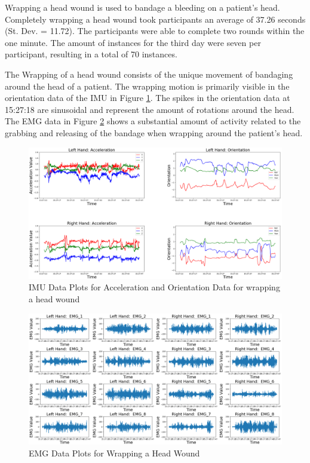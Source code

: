 Wrapping a head wound is used to bandage a bleeding on a patient's head. Completely wrapping a head wound took participants an average of 37.26 seconds (St. Dev. = 11.72). The participants were able to complete two rounds within the one minute. The amount of instances for the third day were seven per participant, resulting in a total of 70 instances.
\par The Wrapping of a head wound consists of the unique movement of bandaging around the head of a patient. The wrapping motion is primarily visible in the orientation data of the IMU in Figure \ref{fig:2334imuday3w47}. The spikes in the orientation data at 15:27:18 are sinusoidal and represent the amount of rotations around the head. The EMG data in Figure \ref{fig:2334emgday3w47} shows a substantial amount of activity related to the grabbing and releasing of the bandage when wrapping around the patient's head.
\begin{figure}[!h]
	\centering
	\includegraphics[width=0.8\linewidth]{pictures/2334_IMU_Day3_w_47}
	\caption{IMU Data Plots for Acceleration and Orientation Data for wrapping a head wound}
	\label{fig:2334imuday3w47}
\end{figure}
\begin{figure}[!h]
	\centering
	\includegraphics[width=0.8\linewidth]{pictures/2334_EMG_Day3_w_47}
	\caption{EMG Data Plots for Wrapping a Head Wound}
	\label{fig:2334emgday3w47}
\end{figure}


